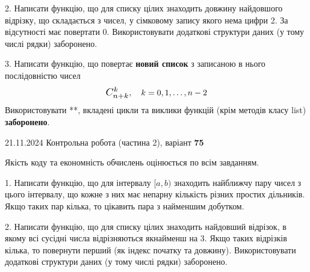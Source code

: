 \documentclass[12pt, ukrainian]{article}
\begin{document}
{{{{{{{{{{{{{{{\begin {large}

2. Написати функцію, що для списку цілих знаходить довжину найдовшого відрізку, що складається з чисел, у сімковому запису якого нема цифри 2. За відсутності має повертати $0$. Використовувати додаткові структури даних (у тому числі рядки) заборонено.

\vspace{10mm}


3. 
Написати функцію, що повертає \textbf{новий список} з записаною в нього послідовністю чисел
$$\scalebox{1.2}{$C_{n+k}^{k}$}, \quad k=0,1,\ldots,n-2$$
Використовувати **, вкладені цикли та виклики функцій (крім методів класу list) \textbf{заборонено}.

\end{large}
\vspace{25mm}


{{21.11.2024 Контрольна робота  (частина 2), варіант  \No \textbf { 75 }\par}}


{
\begin {large}
Якість коду та економність обчислень оцінюється по всім завданням.

\vspace{5mm}

1. Написати функцію, що для інтервалу $[a, b)$ знаходить найближчу пару чисел з цього інтервалу, що кожне з них має непарну кількість різних простих дільників. Якщо таких пар кілька, то цікавить пара з найменшим добутком.

\vspace{10mm}


2. Написати функцію, що для списку цілих знаходить найдовший відрізок, в якому всі сусідні числа відрізняються якнайменш на 3. Якщо таких відрізків кілька, то повернути перший (як індекс початку та довжину). Використовувати додаткові структури даних (у тому числі рядки) заборонено.

\vspace{10mm}



\end{large}}}}}}}}}}}}}}}}}
\end{document}
